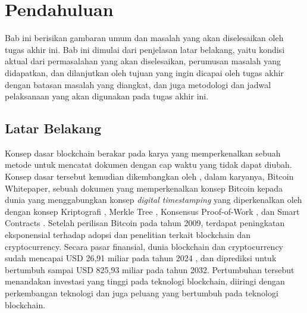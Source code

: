 \chapter{Pendahuluan}


Bab ini berisikan gambaran umum dan masalah yang akan diselesaikan oleh tugas akhir ini. Bab ini dimulai dari penjelasan latar belakang, yaitu kondisi aktual dari permasalahan yang akan diselesaikan, perumusan masalah yang didapatkan, dan dilanjutkan oleh tujuan yang ingin dicapai oleh tugas akhir dengan batasan masalah yang diangkat, dan juga metodologi dan jadwal pelaksanaan yang akan digunakan pada tugas akhir ini. 

\section{Latar Belakang}
\label{sec:latarbelakang}

Konsep dasar blockchain berakar pada karya \cite{haber1991time} yang memperkenalkan sebuah metode untuk mencatat dokumen dengan cap waktu yang tidak dapat diubah. Konsep dasar tersebut kemudian dikembangkan oleh \cite{nakamoto2008bitcoin}, dalam karyanya, Bitcoin Whitepaper, sebuah dokumen yang memperkenalkan konsep Bitcoin kepada dunia yang menggabungkan konsep \textit{digital timestamping} yang diperkenalkan oleh \cite{haber1991time} dengan konsep Kriptografi \parencite{hellman1976new} \parencite{standard1995secure}, Merkle Tree \parencite{merkle1987digital}, Konsensus Proof-of-Work \parencite{dwork1992pricing}, dan Smart Contracts \parencite{szabo1997formalizing}. Setelah perilisan Bitcoin pada tahun 2009, terdapat peningkatan eksponensial terhadap adopsi dan penelitian terkait blockchain dan cryptocurrency. Secara pasar finansial, dunia blockchain dan cryptocurrency sudah mencapai USD 26,91 miliar pada tahun 2024 \parencite{rosencrance2024top}, dan diprediksi untuk bertumbuh sampai USD 825,93 miliar pada tahun 2032. Pertumbuhan tersebut menandakan investasi yang tinggi pada teknologi blockchain, diiringi dengan perkembangan teknologi dan juga peluang yang bertumbuh pada teknologi blockchain. 

